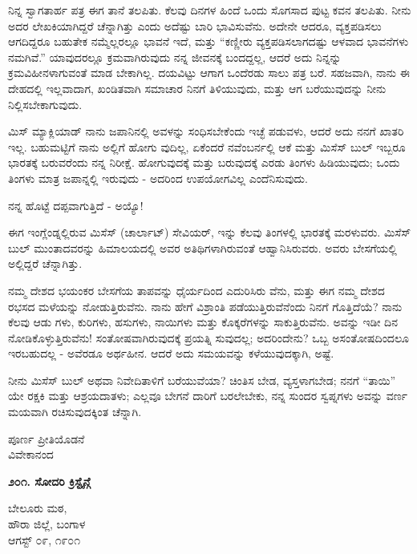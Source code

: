ನಿನ್ನ ಸ್ವಾಗತಾರ್ಹ ಪತ್ರ ಈಗ ತಾನೆ ತಲಪಿತು. ಕೆಲವು ದಿನಗಳ ಹಿಂದೆ ಒಂದು ಸೊಗಸಾದ ಪುಟ್ಟ ಕವನ ತಲಪಿತು. ನೀನು ಅದರ ಲೇಖಕಿಯಾಗಿದ್ದರೆ ಚೆನ್ನಾಗಿತ್ತು ಎಂದು ಅದೆಷ್ಟು ಬಾರಿ ಭಾವಿಸುವೆನು. ಅದೇನೇ ಆದರೂ, ವ್ಯಕ್ತಪಡಿಸಲು ಆಗದಿದ್ದರೂ ಬಹುತೇಕ ನಮ್ಮೆಲ್ಲರಲ್ಲೂ ಭಾವನೆ ಇದೆ, ಮತ್ತು “ಕಣ್ಣೀರು ವ್ಯಕ್ತಪಡಿಸಲಾಗದಷ್ಟು ಆಳವಾದ ಭಾವನೆಗಳು ನಮಗಿವೆ.” ಯಾವುದರಲ್ಲೂ ಕ್ರಮವಾಗಿರುವುದು ನನ್ನ ಜೀವನಕ್ಕೆ ಬಂದದ್ದಲ್ಲ, ಆದರೆ ಅದು ನಿನ್ನನ್ನು ಕ್ರಮವಿಹೀನಳಾಗುವಂತೆ ಮಾಡ ಬೇಕಾಗಿಲ್ಲ. ದಯವಿಟ್ಟು ಆಗಾಗ ಒಂದೆರಡು ಸಾಲು ಪತ್ರ ಬರೆ. ಸಹಜವಾಗಿ, ನಾನು ಈ ದೇಹದಲ್ಲಿ ಇಲ್ಲವಾದಾಗ, ಖಂಡಿತವಾಗಿ ಸಮಾಚಾರ ನಿನಗೆ ತಿಳಿಯುವುದು, ಮತ್ತು ಆಗ ಬರೆಯುವುದನ್ನು ನೀನು ನಿಲ್ಲಿಸಬೇಕಾಗುವುದು.

ಮಿಸ್ ಮ್ಯಾಕ್ಲಿಯಾಡ್ ನಾನು ಜಪಾನಿನಲ್ಲಿ ಅವಳನ್ನು ಸಂಧಿಸಬೇಕೆಂದು ಇಚ್ಛೆ ಪಡುವಳು, ಆದರೆ ಅದು ನನಗೆ ಖಾತರಿ ಇಲ್ಲ. ಬಹುಮಟ್ಟಿಗೆ ನಾನು ಅಲ್ಲಿಗೆ ಹೋಗು ವುದಿಲ್ಲ, ಏಕೆಂದರೆ ನವೆಂಬರ್ನಲ್ಲಿ ಆಕೆ ಮತ್ತು ಮಿಸೆಸ್ ಬುಲ್ ಇಬ್ಬರೂ ಭಾರತಕ್ಕೆ ಬರುವರೆಂದು ನನ್ನ ನಿರೀಕ್ಷೆ. ಹೋಗುವುದಕ್ಕೆ ಮತ್ತು ಬರುವುದಕ್ಕೆ ಎರಡು ತಿಂಗಳು ಹಿಡಿಯುವುದು; ಒಂದು ತಿಂಗಳು ಮಾತ್ರ ಜಪಾನ್ನಲ್ಲಿ ಇರುವುದು - ಅದರಿಂದ ಉಪಯೋಗವಿಲ್ಲ ಎಂದೆನಿಸುವುದು.

ನನ್ನ ಹೊಟ್ಟೆ ದಪ್ಪವಾಗುತ್ತಿದೆ - ಅಯ್ಯೊ!

ಈಗ ಇಂಗ್ಲೆಂಡ್ನಲ್ಲಿರುವ ಮಿಸೆಸ್ (ಚಾರ್ಲಾಟ್) ಸೇವಿಯರ್, ಇನ್ನು ಕೆಲವು ತಿಂಗಳಲ್ಲಿ ಭಾರತಕ್ಕೆ ಮರಳುವರು. ಮಿಸೆಸ್ ಬುಲ್ ಮುಂತಾದವರನ್ನು ಹಿಮಾಲಯದಲ್ಲಿ ಅವರ ಅತಿಥಿಗಳಾಗಿರುವಂತೆ ಆಹ್ವಾನಿಸಿರುವರು. ಅವರು ಬೇಸಗೆಯಲ್ಲಿ ಅಲ್ಲಿದ್ದರೆ ಚೆನ್ನಾಗಿತ್ತು.

ನಮ್ಮ ದೇಶದ ಭಯಂಕರ ಬೇಸಗೆಯ ತಾಪವನ್ನು ಧೈರ್ಯದಿಂದ ಎದುರಿಸಿರು ವೆನು, ಮತ್ತು ಈಗ ನಮ್ಮ ದೇಶದ ರಭಸದ ಮಳೆಯನ್ನು ನೋಡುತ್ತಿರುವೆನು. ನಾನು ಹೇಗೆ ವಿಶ್ರಾಂತಿ ಪಡೆಯುತ್ತಿರುವೆನೆಂದು ನಿನಗೆ ಗೊತ್ತಿದೆಯೆ? ನಾನು ಕೆಲವು ಆಡು ಗಳು, ಕುರಿಗಳು, ಹಸುಗಳು, ನಾಯಿಗಳು ಮತ್ತು ಕೊಕ್ಕರೆಗಳನ್ನು ಸಾಕುತ್ತಿರುವೆನು. ಅವನ್ನು ಇಡೀ ದಿನ ನೋಡಿಕೊಳ್ಳುತ್ತಿರುವೆನು! ಸಂತೋಷವಾಗಿರುವುದಕ್ಕೆ ಪ್ರಯತ್ನಿ ಸುವುದಲ್ಲ; ಅದರಿಂದೇನು? ಒಬ್ಬ ಅಸಂತೋಷದಿಂದಲೂ ಇರಬಹುದಲ್ಲ - ಅವೆರಡೂ ಅರ್ಥಹೀನ. ಆದರೆ ಅದು ಸಮಯವನ್ನು ಕಳೆಯುವುದಕ್ಕಾಗಿ, ಅಷ್ಟೆ.

ನೀನು ಮಿಸೆಸ್ ಬುಲ್ ಅಥವಾ ನಿವೇದಿತಾಳಿಗೆ ಬರೆಯುವೆಯಾ? ಚಿಂತಿಸ ಬೇಡ, ವ್ಯಸ್ತಳಾಗಬೇಡ; ನನಗೆ “ತಾಯಿ” ಯೇ ರಕ್ಷಕಿ ಮತ್ತು ಆಶ್ರಯದಾತಳು; ಎಲ್ಲವೂ ಬೇಗನೆ ದಾರಿಗೆ ಬರಲೇಬೇಕು, ನನ್ನ ಸುಂದರ ಸ್ವಪ್ನಗಳು ಅವನ್ನು ವರ್ಣ ಮಯವಾಗಿ ರಚಿಸುವುದಕ್ಕಿಂತ ಚೆನ್ನಾಗಿ.

\begin{flushright}
ಪೂರ್ಣ ಪ್ರೀತಿಯೊಡನೆ\\ವಿವೇಕಾನಂದ
\end{flushright}

\begin{center}
\textbf{೨೦೧. ಸೋದರಿ ಕ್ರಿಸ್ಟೈನ್ಗೆ}
\end{center}

\begin{flushright}
ಬೇಲೂರು ಮಠ,\\ಹೌರಾ ಜಿಲ್ಲೆ, ಬಂಗಾಳ\\ಆಗಸ್ಟ್ ೦೯, ೧೯೦೧
\end{flushright}

